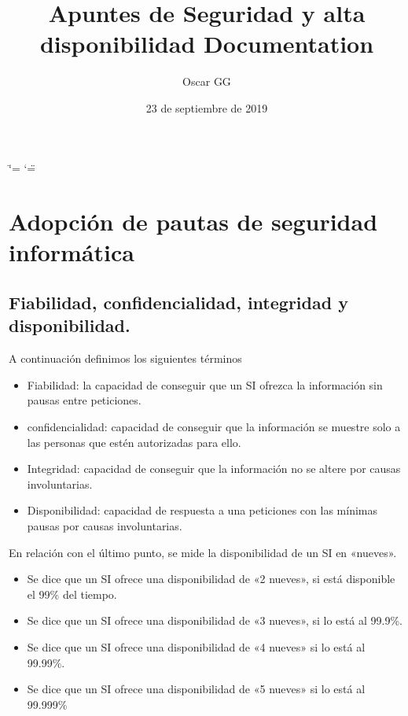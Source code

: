 \documentclass[letterpaper,10pt,spanish]{sphinxmanual}
\title{Apuntes de Seguridad y alta disponibilidad Documentation}
\date{23 de septiembre de 2019}
\author{Oscar GG}
\begin{document}
\ifdefined\shorthandoff
  \ifnum\catcode`\=\string=\active\shorthandoff{=}\fi
  \ifnum\catcode`\"=\active{}\fi
\fi

\pagestyle{empty}
\maketitle
\pagestyle{plain}
\sphinxtableofcontents
\pagestyle{normal}
\label{\detokenize{index::doc}}



\chapter{Adopción de pautas de seguridad informática}
\label{\detokenize{tema_pautas_seguridad_informatica/tema_pautas_seguridad_informatica:adopcion-de-pautas-de-seguridad-informatica}}\label{\detokenize{tema_pautas_seguridad_informatica/tema_pautas_seguridad_informatica::doc}}

\section{Fiabilidad, confidencialidad, integridad y disponibilidad.}
\label{\detokenize{tema_pautas_seguridad_informatica/tema_pautas_seguridad_informatica:fiabilidad-confidencialidad-integridad-y-disponibilidad}}
A continuación definimos los siguientes términos
\begin{itemize}
\item {} 
Fiabilidad: la capacidad de conseguir que un SI ofrezca la información sin pausas entre peticiones.

\item {} 
confidencialidad: capacidad de conseguir que la información se muestre solo a las personas que estén autorizadas para ello.

\item {} 
Integridad: capacidad de conseguir que la información no se altere por causas involuntarias.

\item {} 
Disponibilidad: capacidad de respuesta a una peticiones con las mínimas pausas por causas involuntarias.

\end{itemize}

En relación con el último punto, se mide la disponibilidad de un SI en «nueves».
\begin{itemize}
\item {} 
Se dice que un SI ofrece una disponibilidad de «2 nueves», si está disponible el 99\% del tiempo.

\item {} 
Se dice que un SI ofrece una disponibilidad de «3 nueves», si lo está al 99.9\%.

\item {} 
Se dice que un SI ofrece una disponibilidad de «4 nueves» si lo está al 99.99\%.

\item {} 
Se dice que un SI ofrece una disponibilidad de «5 nueves» si lo está al 99.999\%

\end{itemize}
\end{document}
